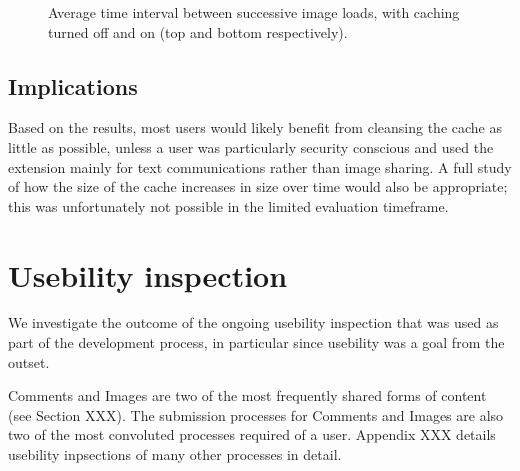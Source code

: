 \begin{figure}[tbph]
\begin{center}
    


\caption{Average time interval between successive image loads, with caching turned off and on (top and bottom respectively).}
\label{graph:img-rest}
\end{center}
\end{figure}


\subsection{Implications}

Based on the results, most users would likely benefit from cleansing the cache as little as possible, unless a user was particularly security conscious and used the extension mainly for text communications rather than image sharing. A full study of how the size of the cache increases in size over time would also be appropriate; this was unfortunately not possible in the limited evaluation timeframe.


\section{Usebility inspection}

We investigate the outcome of the ongoing usebility inspection that was used as part of the development process, in particular since usebility was a goal from the outset.

Comments and Images are two of the most frequently shared forms of content (see Section XXX). The submission processes for Comments and Images are also two of the most convoluted processes required of a user. Appendix XXX details usebility inpsections of many other processes in detail.

